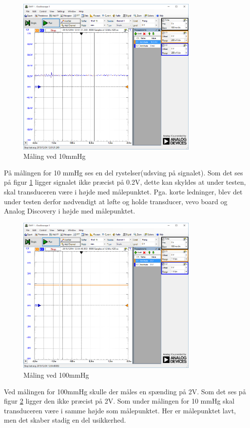\begin{figure}[H]
	\centering	\includegraphics[width=0.8\textwidth]{Figurer/10mmhg}
	\caption{Måling ved 10mmHg}
	\label{fig:vandtest_måling10}
\end{figure}
På målingen for 10 mmHg ses en del rystelser(udsving på signalet). Som det ses på figur \ref{fig:vandtest_måling10} ligger signalet ikke præcist på 0.2V, dette kan skyldes at under testen, skal transduceren være i højde med målepunktet. Pga. korte ledninger, blev det under testen derfor nødvendigt at løfte og holde transducer, vevo board og Analog Discovery i højde med målepunktet. 

\begin{figure}[H]
	\centering	\includegraphics[width=0.8\textwidth]{Figurer/100mmhg}
	\caption{Måling ved 100mmHg}
	\label{fig:vandtest_måling100}
\end{figure}
Ved målingen for 100mmHg skulle der måles en spænding på 2V. Som det ses på figur \ref{fig:vandtest_måling100} ligger den ikke præcist på 2V. Som under målingen for 10 mmHg skal transduceren være i samme højde som målepunktet. Her er målepunktet lavt, men det skaber stadig en del usikkerhed.   
